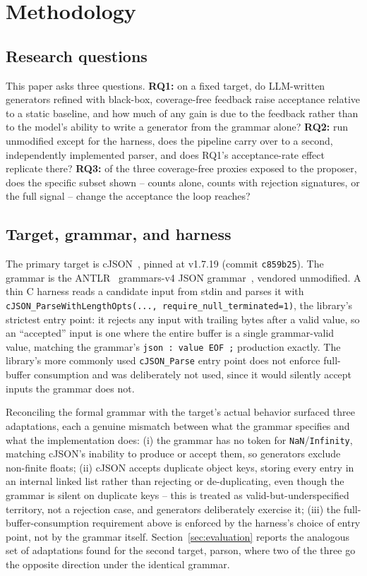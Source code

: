 \section{Methodology}
\label{sec:methodology}

\subsection{Research questions}
This paper asks three questions. \textbf{RQ1:} on a fixed target, do
LLM-written generators refined with black-box, coverage-free feedback raise
acceptance relative to a static baseline, and how much of any gain is due
to the feedback rather than to the model's ability to write a generator
from the grammar alone? \textbf{RQ2:} run
unmodified except for the harness, does the pipeline carry over to a second,
independently implemented parser, and does RQ1's acceptance-rate effect
replicate there?
\textbf{RQ3:} of the three coverage-free proxies exposed to the proposer,
does the specific subset shown -- counts alone, counts with rejection
signatures, or the full signal -- change the acceptance the loop
reaches?

\subsection{Target, grammar, and harness}
The primary target is cJSON~\cite{gamble2024cjson}, pinned at v1.7.19
(commit \texttt{c859b25}). The grammar is the ANTLR~\cite{parr2013antlr}
grammars-v4 JSON grammar~\cite{antlr2024grammarsv4}, vendored unmodified. A thin C harness
reads a candidate input from stdin and parses it with
\texttt{cJSON\_ParseWithLengthOpts(\allowbreak..., \allowbreak require\_null\_terminated=1)}, the
library's strictest entry point: it rejects any input with trailing bytes
after a valid value, so an ``accepted'' input is one where the entire buffer
is a single grammar-valid value, matching the grammar's
\texttt{json : value EOF ;} production exactly. The library's more commonly
used \texttt{cJSON\_Parse} entry point does not enforce full-buffer
consumption and was deliberately not used, since it would silently accept
inputs the grammar does not.

Reconciling the formal grammar with the target's actual behavior surfaced
three adaptations, each a genuine mismatch between what the grammar
specifies and what the implementation does: (i) the grammar has no token for
\texttt{NaN}/\texttt{Infinity}, matching cJSON's inability to produce or
accept them, so generators exclude non-finite floats; (ii) cJSON accepts
duplicate object keys, storing every entry in an internal linked list rather
than rejecting or de-duplicating, even though the grammar is silent on
duplicate keys -- this is treated as valid-but-underspecified territory, not
a rejection case, and generators deliberately exercise it; (iii) the
full-buffer-consumption requirement above is enforced by the harness's
choice of entry point, not by the grammar itself. Section~\ref{sec:evaluation}
reports the analogous set of adaptations found for the second target,
parson, where two of the three go the opposite direction under the identical
grammar.

